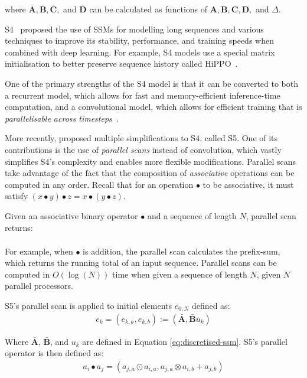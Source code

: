 \documentclass{article}
\newcommand{\oldop}{\bullet}
\begin{document}
where $\mathbf{\bar{A}}, \mathbf{\bar{B}}, \mathbf{\bar{C}},$ and $\mathbf{\bar{D}}$ can be calculated as functions of $\mathbf{A}, \mathbf{B}, \mathbf{C}, \mathbf{D},$ and $\Delta$. 

S4~\citep{gu2021efficiently} proposed the use of SSMs for modelling long sequences and various techniques to improve its stability, performance, and training speeds when combined with deep learning. For example, S4 models use a special matrix initialisation to better preserve sequence history called HiPPO~\citep{gu2020hippo}. 

One of the primary strengths of the S4 model is that it can be converted to both a recurrent model, which allows for fast and memory-efficient inference-time computation, and a convolutional model, which allows for efficient training that is \textit{parallelisable across timesteps}~\citep{gu2021combining}. 

More recently, \citet{smith2022simplified} proposed multiple simplifications to S4, called S5. One of its contributions is the use of \textit{parallel scans} instead of convolution, which vastly simplifies S4's complexity and enables more flexible modifications. Parallel scans take advantage of the fact that the composition of \textit{associative} operations can be computed in any order. Recall that for an operation $\oldop$ to be associative, it must satisfy $(x \oldop y) \oldop z = x \oldop (y \oldop z)$.

Given an associative binary operator $\oldop$ and a sequence of length $N$, parallel scan returns:
\begin{align}
[ e_1, e_1 \oldop e_2, \cdots, e_1 \oldop e_2 \oldop \cdots \oldop e_N ]
\end{align}

For example, when $\oldop$ is addition, the parallel scan calculates the prefix-sum, which returns the running total of an input sequence. Parallel scans can be computed in $O(\log(N))$ time when given a sequence of length $N$, given $N$ parallel processors. 

S5's parallel scan is applied to initial elements $e_{0:N}$ defined as:
\begin{align}
e_k = (e_{k,a}, e_{k,b}) := (\mathbf{\bar{A}}, \mathbf{\bar{B}}u_k)
\end{align} 

Where $\mathbf{\bar{A}}$, $\mathbf{\bar{B}}$, and $u_k$ are defined in Equation \ref{eq:discretised-ssm}. S5's parallel operator is then defined as: 
\begin{align}
\label{eq:s5-op}
a_i \oldop a_j = (a_{j,a} \odot a_{i,a}, a_{j,a} \otimes a_{i,b} + a_{j,b})
\end{align}
\end{document}
